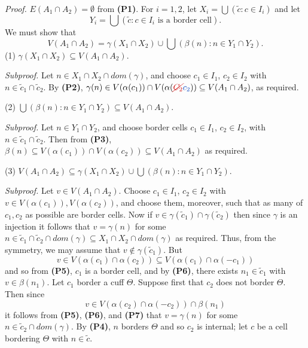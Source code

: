 \textit{Proof.} $E(A_1 \cap A_2) = \emptyset$ from \textbf{(P1)}. For $i = 1, 2$, let $X_i = \bigcup (\tilde{c} : c \in I_i)$ and let
\begin{equation*}
Y_i = \bigcup (\tilde{c} : c \in I_i \text{ is a border cell}).
\end{equation*}
We must show that
\begin{equation*}
V(A_1 \cap A_2) = \gamma(X_1 \cap X_2) \cup \bigcup (\beta(n) : n \in Y_1 \cap Y_2).
\end{equation*}
\hspace*{12pt}(1) $\gamma(X_1 \cap X_2) \subseteq V(A_1 \cap A_2)$.

\textit{Subproof.} Let $n \in X_1 \cap X_2 \cap dom(\gamma)$, and choose $c_1 \in I_1$, $c_2 \in I_2$ with $n \in \tilde{c}_1 \cap \tilde{c}_2$. By \textbf{(P2)}, $\gamma(n) \in V(\alpha(c_1)) \cap V(\alpha(\delm{C_2}\fix{c_2})) \subseteq V(A_1 \cap A_2)$, as required.

\hspace*{12pt}(2) $\bigcup (\beta(n) : n \in Y_1 \cap Y_2) \subseteq V(A_1 \cap A_2)$.

\textit{Subproof.} Let $n \in Y_1 \cap Y_2$, and choose border cells $c_1 \in I_1$, $c_2 \in I_2$, with $n \in \tilde{c}_1 \cap \tilde{c}_2$. Then from \textbf{(P3)}, $\beta(n) \subseteq V(\alpha(c_1)) \cap V(\alpha(c_2)) \subseteq V(A_1 \cap A_2)$ as required.

\hspace*{12pt}(3) $V(A_1 \cap A_2) \subseteq \gamma(X_1 \cap X_2) \cup \bigcup (\beta(n) : n \in Y_1 \cap Y_2)$.

\textit{Subproof.} Let $v \in V(A_1 \cap A_2)$. Choose $c_1 \in I_1$, $c_2 \in I_2$ with $v \in V(\alpha(c_1)), V(\alpha(c_2))$, and choose them, moreover, such that as many of $c_1, c_2$ as possible are border cells. Now if $v \in \gamma(\tilde{c}_1) \cap \gamma(\tilde{c}_2)$ then since $\gamma$ is an injection it follows that $v = \gamma(n)$ for some $n \in \tilde{c}_1 \cap \tilde{c}_2 \cap dom(\gamma) \subseteq X_1 \cap X_2 \cap dom(\gamma)$ as required. Thus, from the symmetry, we may assume that $v \notin \gamma(\tilde{c}_1)$. But
\begin{equation*}
v \in V(\alpha(c_1) \cap \alpha(c_2)) \subseteq V(\alpha(c_1) \cap \alpha(-c_1))
\end{equation*}
and so from \textbf{(P5)}, $c_1$ is a border cell, and by \textbf{(P6)}, there exists $n_1 \in \tilde{c}_1$ with $v \in \beta(n_1)$. Let $c_1$ border a cuff $\Theta$. Suppose first that $c_2$ does not border $\Theta$. Then since
\begin{equation*}
v \in V(\alpha(c_2) \cap \alpha(-c_2)) \cap \beta(n_1)
\end{equation*}
it follows from \textbf{(P5)}, \textbf{(P6)}, and \textbf{(P7)} that $v = \gamma(n)$ for some $n \in \tilde{c}_2 \cap dom(\gamma)$. By \textbf{(P4)}, $n$ borders $\Theta$ and so $c_2$ is internal; let $c$ be a cell bordering $\Theta$ with $n \in \tilde{c}$.

